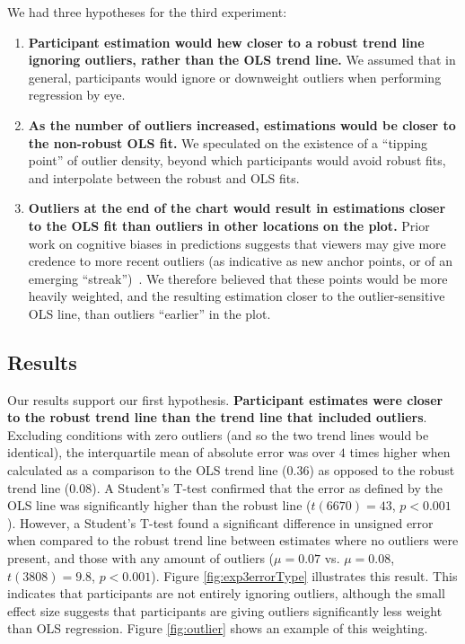 \documentclass{sigchi}
\begin{document}
We had three hypotheses for the third experiment:
\begin{enumerate}
	\item \textbf{Participant estimation would hew closer to a robust trend line ignoring outliers, rather than the OLS trend line.} We assumed that in general, participants would ignore or downweight outliers when performing regression by eye.
	\item \textbf{As the number of outliers increased, estimations would be closer to the non-robust OLS fit.} We speculated on the existence of a ``tipping point'' of outlier density, beyond which participants would avoid robust fits, and interpolate between the robust and OLS fits.
	\item \textbf{Outliers at the end of the chart would result in estimations closer to the OLS fit than outliers in other locations on the plot.} Prior work on cognitive biases in predictions suggests that viewers may give more credence to more recent outliers (as indicative as new anchor points, or of an emerging ``streak'')~\cite{croson2005gambler}. We therefore believed that these points would be more heavily weighted, and the resulting estimation closer to the outlier-sensitive OLS line, than outliers ``earlier'' in the plot.
\end{enumerate}

\subsection{Results}

\expThreeErrorFig

\expThreeOutliersFig

Our results support our first hypothesis. \textbf{Participant estimates were closer to the robust trend line than the trend line that included outliers}. Excluding conditions with zero outliers (and so the two trend lines would be identical), the interquartile mean of absolute error was over $4$ times higher when calculated as a comparison to the OLS trend line ($0.36$) as opposed to the robust trend line ($0.08$). A Student's T-test confirmed that the error as defined by the OLS line was significantly higher than the robust line ($t(6670)= 43$, $p<0.001$). However, a Student's T-test found a significant difference in unsigned error when compared to the robust trend line between estimates where no outliers were present, and those with any amount of outliers ($\mu=0.07$ vs. $\mu=0.08$, $t(3808) = 9.8$, $p<0.001$). Figure \ref{fig:exp3errorType} illustrates this result. This indicates that participants are not entirely ignoring outliers, although the small effect size suggests that participants are giving outliers significantly less weight than OLS regression. Figure \ref{fig:outlier} shows an example of this weighting.
\end{document}
